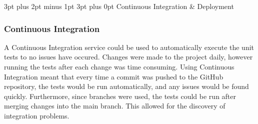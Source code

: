 \documentclass[12pt,a4paper]{article}
\makeatletter
\renewcommand\subsection{\@startsection {subsection}{1}{2mm} %
                                        {3pt plus 2pt minus 1pt} %
                                        {3pt plus 0pt} %
                                        {\normalfont\bfseries}}
\makeatother
\begin{document}
\subsection{Continuous Integration \& Deployment}
\subsubsection{Continuous Integration}
A Continuous Integration service could be used to automatically execute the unit tests to no issues have occured. Changes were made to the project daily, however running the tests after each change was time consuming. Using Continuous Integration meant that every time a commit was pushed to the GitHub repository, the tests would be run automatically, and any issues would be found quickly. Furthermore, since branches were used, the tests could be run after merging changes into the main branch. This allowed for the discovery of integration problems.
\end{document}
